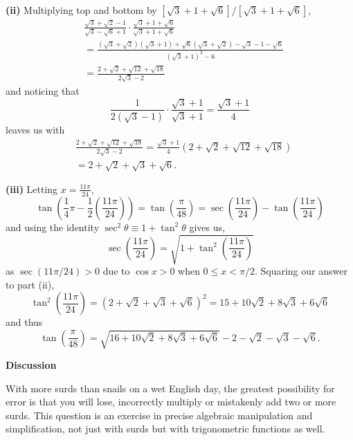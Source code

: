 \documentclass{article}
\begin{document}
\textbf{(ii)} Multiplying top and bottom by $[\sqrt{3} + 1 + \sqrt{6}]/[\sqrt{3} + 1 + \sqrt{6}]$,
\begin{align*}
& \frac{\sqrt{3} + \sqrt{2} -1}{\sqrt{3} - \sqrt{6} + 1} \cdot \frac{\sqrt{3}+1+\sqrt{6}}{\sqrt{3} +1+\sqrt{6}} \\[2pt] 
& = \frac{(\sqrt{3} + \sqrt{2})(\sqrt{3} + 1) + \sqrt{6}(\sqrt{3} + \sqrt{2}) - \sqrt{3} -1 -\sqrt{6}}{(\sqrt{3} + 1)^2 - 6} \\[2pt]
& = \frac{2 + \sqrt{2} + \sqrt{12} + \sqrt{18}}{2\sqrt{3}-2}
\end{align*}
and noticing that 
\[
\frac{1}{2(\sqrt{3}-1)} \cdot \frac{\sqrt{3} + 1}{\sqrt{3} + 1} = \frac{\sqrt{3} + 1}{4}
\]
leaves us with 
\begin{align*}
& \frac{2 + \sqrt{2} + \sqrt{12} + \sqrt{18}}{2\sqrt{3}-2} = \frac{\sqrt{3} + 1}{4}(2 + \sqrt{2} + \sqrt{12} + \sqrt{18}) \\ 
& = 2 + \sqrt{2} + \sqrt{3} + \sqrt{6}.
\end{align*}

\vspace{0.5cm}

\textbf{(iii)} Letting $x = \frac{11\pi}{24}$,
\[
\tan\left(\frac{1}{4}\pi - \frac{1}{2}\left(\frac{11\pi}{24}\right)\right)= \tan\left(\frac{\pi}{48}\right) =\sec\left(\frac{11\pi}{24}\right) - \tan\left(\frac{11\pi}{24}\right) 
\]
and using the identity $\sec^2 \theta \equiv 1+ \tan^2 \theta$ gives us,
\[
\sec\left(\frac{11\pi}{24}\right) = \sqrt{1+\tan^2\left(\frac{11\pi}{24}\right)}
\]
as $\sec(11\pi/24)>0$ due to $\cos x > 0$ when $0\leq x < \pi/2$. Squaring our answer to part (ii),
\[
\tan^2\left(\frac{11\pi}{24}\right) = (2 + \sqrt{2} + \sqrt{3} + \sqrt{6})^2 = 15 + 10\sqrt{2} + 8\sqrt{3} + 6\sqrt{6}
\]
and thus 
\[
\tan\left(\frac{\pi}{48}\right) = \sqrt{16 + 10\sqrt{2} + 8\sqrt{3} + 6\sqrt{6}} -2 - \sqrt{2} - \sqrt{3} - \sqrt{6}.
\]
\newpage

\begin{center}
    \textbf{Discussion}
\end{center}

\vspace{0.5cm}

With more surds than snails on a wet English day, the greatest possibility for error is that you will lose, incorrectly multiply or mistakenly add two or more surds. This question is an exercise in precise algebraic manipulation and simplification, not just with surds but with trigonometric functions as well.\par
\end{document}
